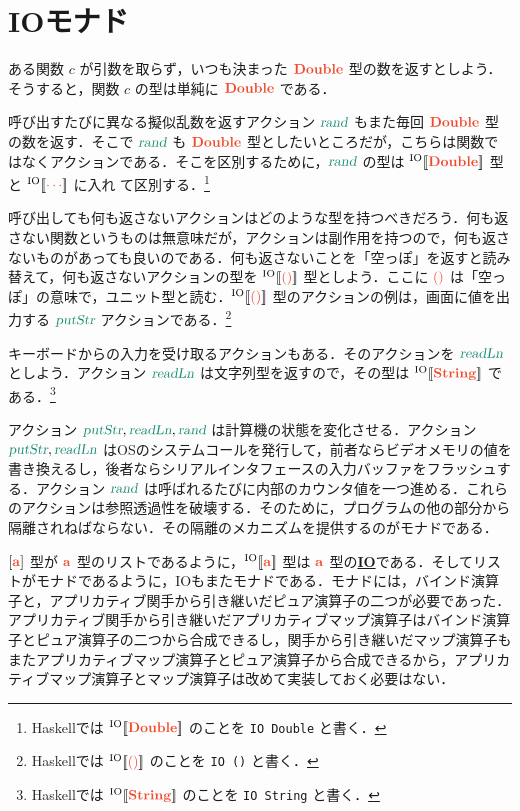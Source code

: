 \documentclass[a5paper,twoside,fleqn,draft]{jsbook}
\def\[{[\![}
\def\]{]\!]}
\def\actionColor{PineGreen}
\def\typeColor{RedOrange}
\newcommand{\programminglanguage}[1]{\textsf{#1}}
\newcommand{\haskell}{\programminglanguage{Haskell}}
\newcommand{\keyword}[1]{{\underline{\textbf{#1}}}}
\newcommand{\code}[1]{\texttt{#1}}
\newcommand{\mActionLong}[1]{\textcolor{\actionColor}{\textsl{#1}}}
\DeclareMathOperator{\mReadLn}{\mActionLong{readLn}}
\DeclareMathOperator{\mPutStr}{\mActionLong{putStr}}
\DeclareMathOperator{\mRand}{\mActionLong{rand}}
\newcommand{\mType}[1]{\textcolor{\typeColor}{\mathbf{#1}}}
\newcommand{\mA}{\mType{a}}
\newcommand{\mDoubleType}{\mType{Double}}
\newcommand{\mStringType}{\mType{String}}
\newcommand{\mUnitType}{\mType{()}}
\newcommand{\mTypeAssemble}[2]{{}^\mathrm{#1}\[\mType{#2}\]}
\newcommand{\mIOType}[1]{\mTypeAssemble{IO}{#1}}
\newcommand{\mIODoubleType}{\mIOType{\mDoubleType}}
\newcommand{\mIOStringType}{\mIOType{\mStringType}}
\newcommand{\mIOUnitType}{\mIOType{\mUnitType}}
\begin{document}
\section{IOモナド}

ある関数 $c$ が引数を取らず，いつも決まった $\mDoubleType$ 型の数を返すとしよう．そうすると，関数 $c$ の型は単純に $\mDoubleType$ である．

呼び出すたびに異なる擬似乱数を返すアクション $\mRand$ もまた毎回 $\mDoubleType$ 型の数を返す．そこで $\mRand$ も $\mDoubleType$ 型としたいところだが，こちらは関数ではなくアクションである．そこを区別するために，$\mRand$ の型は $\mIODoubleType$ 型と $\mIOType{\dotsb}$ に入れ
て区別する．\footnote{\haskell では $\mIODoubleType$ のことを \code{IO Double} と書く．}

呼び出しても何も返さないアクションはどのような型を持つべきだろう．何も返さない関数というものは無意味だが，アクションは副作用を持つので，何も返さないものがあっても良いのである．何も返さないことを「空っぽ」を返すと読み替えて，何も返さないアクションの型を $\mIOUnitType$ 型としよう．ここに $\mUnitType$ は「空っぽ」の意味で，ユニット型と読む．$\mIOUnitType$ 型のアクションの例は，画面に値を出力する $\mPutStr$ アクションである．\footnote{\haskell では $\mIOUnitType$ のことを \code{IO ()} と書く．}

キーボードからの入力を受け取るアクションもある．そのアクションを $\mReadLn$ としよう．アクション $\mReadLn$ は文字列型を返すので，その型は $\mIOStringType$ である．\footnote{\haskell では $\mIOStringType$ のことを \code{IO String} と書く．}

アクション $\mPutStr,\mReadLn,\mRand$ は計算機の状態を変化させる．アクション $\mPutStr,\mReadLn$ はOSのシステムコールを発行して，前者ならビデオメモリの値を書き換えるし，後者ならシリアルインタフェースの入力バッファをフラッシュする．アクション $\mRand$ は呼ばれるたびに内部のカウンタ値を一つ進める．これらのアクションは参照透過性を破壊する．そのために，プログラムの他の部分から隔離されねばならない．その隔離のメカニズムを提供するのがモナドである．

$[\mA]$ 型が $\mA $ 型のリストであるように，$\mIOType{a}$ 型は $\mA $ 型の\keyword{IO}である．そしてリストがモナドであるように，IOもまたモナドである．モナドには，バインド演算子と，アプリカティブ関手から引き継いだピュア演算子の二つが必要であった．アプリカティブ関手から引き継いだアプリカティブマップ演算子はバインド演算子とピュア演算子の二つから合成できるし，関手から引き継いだマップ演算子もまたアプリカティブマップ演算子とピュア演算子から合成できるから，アプリカティブマップ演算子とマップ演算子は改めて実装しておく必要はない．
\end{document}
